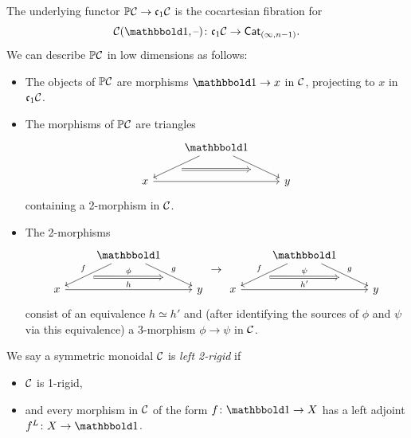 \documentclass[a4paper,11pt]{article}
\begin{document}
\begin{observation}
  The underlying functor $\mP\nC \to \core\nC$ is the cocartesian
  fibration for 
  \[ \nC(\bbone, \blank) \colon \core\nC \to \Cat_{(\infty,n-1)}.\] We
  can describe $\mathbb{P}\mathcal{C}$ in low dimensions as follows:
  \begin{itemize}
  \item The objects of $\mathbb{P}\mathcal{C}$ are morphisms $\bbone \to x$ in $\mathcal{C}$,
    projecting to $x$ in $\mathfrak{c}_{1}\mathcal{C}$.
  \item The morphisms of $\mathbb{P}\mathcal{C}$ are triangles
    \[
      \begin{tikzcd}
        {} & \bbone \ar[dl, ""{name=A}] \ar[dr, ""{swap, name=B}] \\
        x \ar[rr] & & y \ar[from=A, to=B, Rightarrow]
      \end{tikzcd}
    \]
    containing a 2-morphism in $\mathcal{C}$.
  \item The 2-morphisms
    \[
      \begin{tikzcd}
        {} & \bbone \ar[dl, "f"', ""{name=A}] \ar[dr, "g", ""{swap, name=B}] \\
        x \ar[rr, "h"] & & y \ar[from=A, to=B, Rightarrow, "\phi"]
      \end{tikzcd} \to \begin{tikzcd}
        {} & \bbone \ar[dl, "f"', ""{name=A}] \ar[dr, "g", ""{swap, name=B}] \\
        x \ar[rr, "h'"] & & y \ar[from=A, to=B, Rightarrow, "\psi"]
      \end{tikzcd}
    \]
    consist of an equivalence $h\simeq h'$ and (after identifying the
    sources of $\phi$ and $\psi$ via this equivalence) a 3-morphism
    $\phi \to \psi$ in $\mathcal{C}$.
  \end{itemize}
\end{observation}


\begin{defn}
  We say a symmetric monoidal \incat{} $\mathcal{C}$ is \emph{left 2-rigid} if
  \begin{itemize}
  \item $\mathcal{C}$ is 1-rigid,
  \item and every morphism in $\mathcal{C}$ of the form $f \colon \bbone \to X$ has a left
    adjoint $f^{L} \colon X \to \bbone$.
  \end{itemize}
\end{defn}
\end{document}
